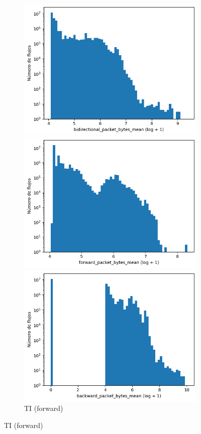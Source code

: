 \begin{figure}[H]
\begin{subfigure}[b]{0.26\textwidth}
        \includegraphics[width=\linewidth]{media/packet_pincer_toniot/bidirectional_packet_bytes_mean_log_x_log_y.png}
        \caption{TI (bidir.)}
        \includegraphics[width=\textwidth]{media/packet_pincer_toniot/forward_packet_bytes_mean_log_x_log_y.png}
        \caption{TI (forward)}
        \includegraphics[width=\textwidth]{media/packet_pincer_toniot/backward_packet_bytes_mean_log_x_log_y.png}

\end{subfigure}
\end{figure}
